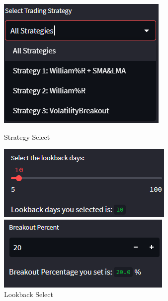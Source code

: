 \begin{figure}[ht]
    \begin{minipage}[b]{0.4\textwidth}
        \includegraphics[width=\textwidth]{Images/strategies.png}
        \caption{Strategy Select}
        \label{fig:image2}
    \end{minipage}
    \hfill
    \begin{minipage}[b]{0.4\textwidth}
        \includegraphics[width=\textwidth]{Images/lookback.png}
        \caption{Lookback Select}
        \label{fig:image2}
    \end{minipage}
    \begin{minipage}[b]{0.4\textwidth}
        \includegraphics[width=\textwidth]{Images/breakout.png}

\end{minipage}
\end{figure}

